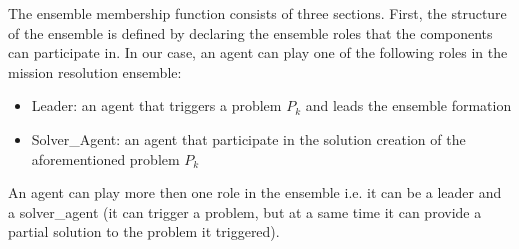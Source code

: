 \documentclass[journal]{IEEEtran}
\theoremstyle{definition}
\begin{document}
The ensemble membership function 
consists of three sections. First, the
structure of the ensemble is defined by declaring the ensemble
roles that the components can participate in.
In our case, an agent can play one of the following roles in the mission resolution ensemble:
\begin{itemize}
\item Leader: an agent that triggers a problem $P_k$ and leads the ensemble formation
\item Solver\_Agent: an agent that participate in the solution creation of the aforementioned problem $P_k$
\end{itemize}
An agent can play more then one role in the ensemble i.e. it can be a leader and a solver\_agent (it can trigger a problem, but at a same time it can provide a partial solution to the problem it triggered).


\end{document}
